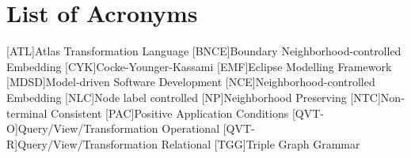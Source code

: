 \chapter*{List of Acronyms}
\begin{acronym}[MDSD]
	[ATL]{Atlas Transformation Language}
	[BNCE]{Boundary Neighborhood-controlled Embedding}
	[CYK]{Cocke-Younger-Kassami}
	[EMF]{Eclipse Modelling Framework}
	[MDSD]{Model-driven Software Development}
	[NCE]{Neighborhood-controlled Embedding}
	[NLC]{Node label controlled}
	[NP]{Neighborhood Preserving}
	[NTC]{Non-terminal Consistent}
	[PAC]{Positive Application Conditions}
	[QVT-O]{Query/View/Transformation Operational}
	[QVT-R]{Query/View/Transformation Relational}
	[TGG]{Triple Graph Grammar}
\end{acronym}